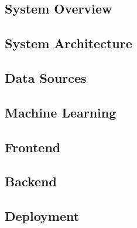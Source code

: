 \subsection{System Overview}


\subsection{System Architecture} \label{systemarchitecture}


\subsection{Data Sources}


\subsection{Machine Learning}


\subsection{Frontend}


\subsection{Backend}


\subsection{Deployment}
